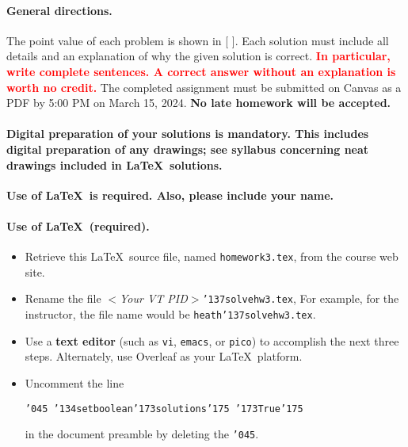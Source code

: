 \documentclass[11pt,twoside]{article}
\newcommand{\mybackslash}{\char'134}
\newcommand{\myleftbracket}{\char'173}
\newcommand{\myrightbracket}{\char'175}
\newcommand{\mypercent}{\char'045}
\newcommand{\myunderscore}{\char'137}
\newcommand{\duedate}{March 15, 2024}
\newcommand{\homeworknumber}{3}
\newcounter{problem}
\begin{document}
{
\begingroup %
\paragraph{General directions.}
The point value of each problem is shown in [ ].
Each solution must include all details and
an explanation of why the given solution is correct.
\textbf{\textcolor{red}{In particular,
write complete sentences.
A correct answer without an explanation is worth no credit.}}
The completed assignment must be submitted on Canvas as a PDF by 5:00 PM
on \duedate.
\textbf{No late homework will be accepted.}

\paragraph{Digital preparation of your solutions is mandatory.
This includes digital preparation of any drawings; see syllabus
concerning neat drawings included in \LaTeX\ solutions.}
\textbf{Use of \LaTeX\ is required.
Also,
please include your name.}

\paragraph{Use of \LaTeX\ (required).}
\begin{itemize}
\item Retrieve this \LaTeX\ source file,
named
\texttt{homework\homeworknumber.tex},
from the course web site.
\item Rename the file
\textit{$<$Your VT PID$>$}\texttt{{\myunderscore}solvehw\homeworknumber.tex},
For example,
for the instructor,
the file name would be
\texttt{heath{\myunderscore}solvehw\homeworknumber.tex}.

\item
Use a \textbf{text editor}
(such as \texttt{vi}, \texttt{emacs}, or \texttt{pico})
to accomplish the next three steps.
Alternately,
use Overleaf as your \LaTeX\ platform.

\item
Uncomment the line

\texttt{{\mypercent} 
{\mybackslash}setboolean{\myleftbracket}solutions{\myrightbracket}%
{\myleftbracket}True{\myrightbracket}}

in the document preamble by deleting the \texttt{\mypercent}.


\end{itemize}}
\end{document}
